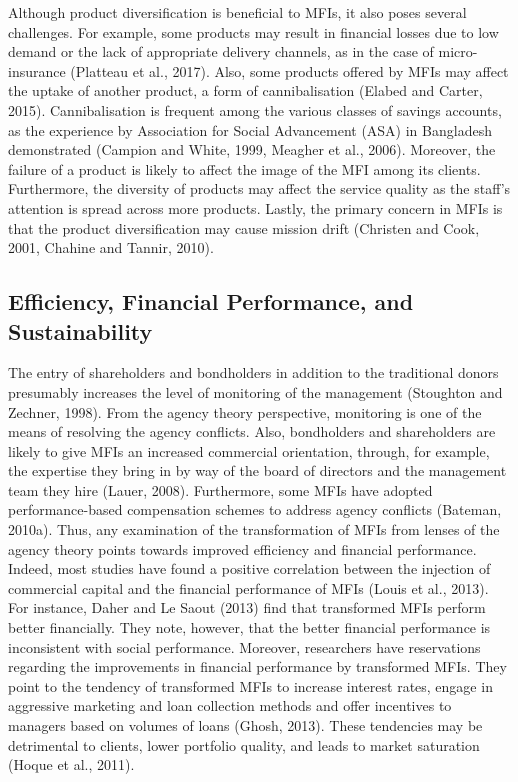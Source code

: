 \documentclass[a4paper, nobind]{templates/ociamthesis}
\begin{document}
Although product diversification is beneficial to MFIs, it also poses several challenges. For example, some products may result in financial losses due to low demand or the lack of appropriate delivery channels, as in the case of micro-insurance (Platteau et al., 2017). Also, some products offered by MFIs may affect the uptake of another product, a form of cannibalisation (Elabed and Carter, 2015). Cannibalisation is frequent among the various classes of savings accounts, as the experience by Association for Social Advancement (ASA) in Bangladesh demonstrated (Campion and White, 1999, Meagher et al., 2006). Moreover, the failure of a product is likely to affect the image of the MFI among its clients. Furthermore, the diversity of products may affect the service quality as the staff's attention is spread across more products. Lastly, the primary concern in MFIs is that the product diversification may cause mission drift (Christen and Cook, 2001, Chahine and Tannir, 2010).

\hypertarget{efficiency-financial-performance-and-sustainability}{%
\subsection{Efficiency, Financial Performance, and Sustainability}\label{efficiency-financial-performance-and-sustainability}}

\noindent The entry of shareholders and bondholders in addition to the traditional donors presumably increases the level of monitoring of the management (Stoughton and Zechner, 1998). From the agency theory perspective, monitoring is one of the means of resolving the agency conflicts. Also, bondholders and shareholders are likely to give MFIs an increased commercial orientation, through, for example, the expertise they bring in by way of the board of directors and the management team they hire (Lauer, 2008).
Furthermore, some MFIs have adopted performance-based compensation schemes to address agency conflicts (Bateman, 2010a). Thus, any examination of the transformation of MFIs from lenses of the agency theory points towards improved efficiency and financial performance. Indeed, most studies have found a positive correlation between the injection of commercial capital and the financial performance of MFIs (Louis et al., 2013). For instance, Daher and Le Saout (2013) find that transformed MFIs perform better financially. They note, however, that the better financial performance is inconsistent with social performance.
Moreover, researchers have reservations regarding the improvements in financial performance by transformed MFIs. They point to the tendency of transformed MFIs to increase interest rates, engage in aggressive marketing and loan collection methods and offer incentives to managers based on volumes of loans (Ghosh, 2013). These tendencies may be detrimental to clients, lower portfolio quality, and leads to market saturation (Hoque et al., 2011).
\end{document}
